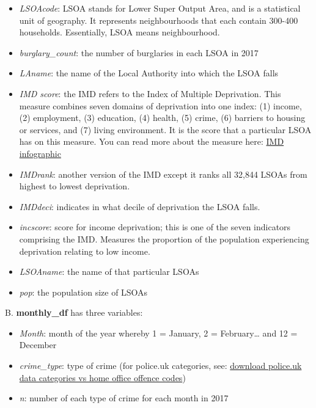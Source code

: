 \documentclass[
]{book}
\providecommand{\tightlist}{%
  \setlength{\itemsep}{0pt}\setlength{\parskip}{0pt}}
\begin{document}
\begin{itemize}
\tightlist
\item
  \emph{LSOAcode}: LSOA stands for Lower Super Output Area, and is a statistical unit of geography. It represents neighbourhoods that each contain 300-400 households. Essentially, LSOA means neighbourhood.
\item
  \emph{burglary\_count}: the number of burglaries in each LSOA in 2017
\item
  \emph{LAname}: the name of the Local Authority into which the LSOA falls
\item
  \emph{IMD score}: the IMD refers to the Index of Multiple Deprivation. This measure combines seven domains of deprivation into one index: (1) income, (2) employment, (3) education, (4) health, (5) crime, (6) barriers to housing or services, and (7) living environment. It is the score that a particular LSOA has on this measure. You can read more about the measure here: \href{https://assets.publishing.service.gov.uk/government/uploads/system/uploads/attachment_data/file/833959/IoD2019_Infographic.pdf}{IMD infographic}\\
\item
  \emph{IMDrank}: another version of the IMD except it ranks all 32,844 LSOAs from highest to lowest deprivation.
\item
  \emph{IMDdeci}: indicates in what decile of deprivation the LSOA falls.
\item
  \emph{incscore}: score for income deprivation; this is one of the seven indicators comprising the IMD. Measures the proportion of the population experiencing deprivation relating to low income.
\item
  \emph{LSOAname}: the name of that particular LSOAs
\item
  \emph{pop}: the population size of LSOAs
\end{itemize}

B. \textbf{monthly\_df} has three variables:

\begin{itemize}
\tightlist
\item
  \emph{Month}: month of the year whereby 1 = January, 2 = February\ldots{} and 12 = December
\item
  \emph{crime\_type}: type of crime (for police.uk categories, see: \href{https://www.police.uk/SysSiteAssets/police-uk/media/downloads/crime-categories/police-uk-category-mappings.csv}{download police.uk data categories vs home office offence codes})
\item
  \emph{n}: number of each type of crime for each month in 2017
\end{itemize}
\end{document}
